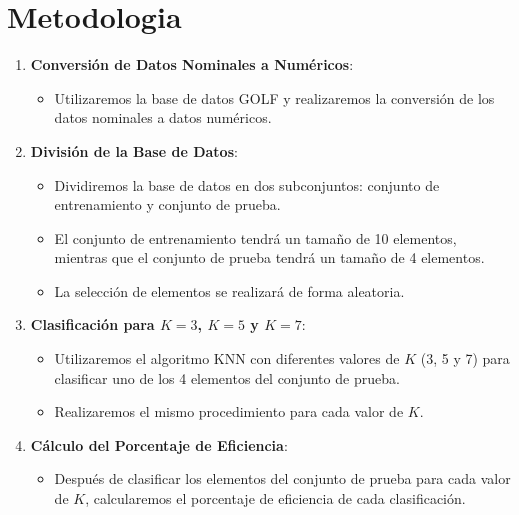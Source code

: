 
\section{Metodologia} \label{sec:Metodologia}

\begin{enumerate}
    \item \textbf{Conversión de Datos Nominales a Numéricos}:
    \begin{itemize}
        \item Utilizaremos la base de datos GOLF y realizaremos la conversión de los datos nominales a datos numéricos.
    \end{itemize}

    \item \textbf{División de la Base de Datos}:
    \begin{itemize}
        \item Dividiremos la base de datos en dos subconjuntos: conjunto de entrenamiento y conjunto de prueba.
        \item El conjunto de entrenamiento tendrá un tamaño de 10 elementos, mientras que el conjunto de prueba tendrá un tamaño de 4 elementos.
        \item La selección de elementos se realizará de forma aleatoria.
    \end{itemize}

    \item \textbf{Clasificación para $K=3$, $K=5$ y $K=7$}:
    \begin{itemize}
        \item Utilizaremos el algoritmo KNN con diferentes valores de $K$ (3, 5 y 7) para clasificar uno de los 4 elementos del conjunto de prueba.
        \item Realizaremos el mismo procedimiento para cada valor de $K$.
    \end{itemize}

    \item \textbf{Cálculo del Porcentaje de Eficiencia}:
    \begin{itemize}
        \item Después de clasificar los elementos del conjunto de prueba para cada valor de $K$, calcularemos el porcentaje de eficiencia de cada clasificación.
    \end{itemize}


\end{enumerate}
